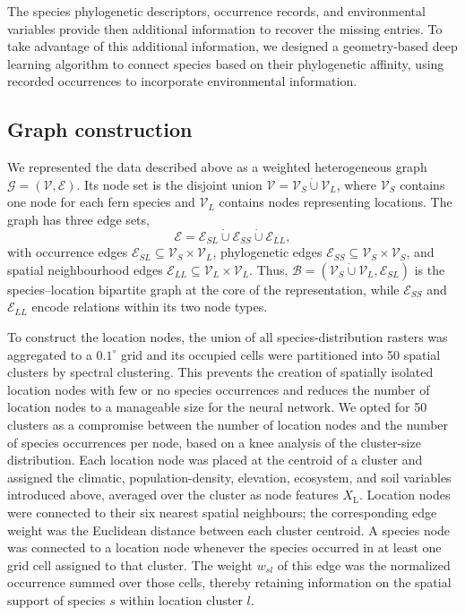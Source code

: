 \documentclass[preprint,12pt,authoryear]{elsarticle}
\begin{document}
The species phylogenetic descriptors, occurrence records, and environmental variables provide then additional information to recover the missing entries. To take advantage of this additional information, we designed a geometry-based deep learning algorithm to connect species based on their phylogenetic affinity, using recorded occurrences to incorporate environmental information.  

\subsection{Graph construction}
We represented the data described above as a weighted heterogeneous graph
$\mathcal{G}=(\mathcal{V},\mathcal{E})$. Its node set is the disjoint union
$\mathcal{V}=\mathcal{V}_{S}\mathbin{\dot\cup}\mathcal{V}_{L}$, where
$\mathcal{V}_{S}$ contains one node for each fern species and
$\mathcal{V}_{L}$ contains nodes representing locations. The graph has three
edge sets,
\begin{equation}
    \mathcal{E}=\mathcal{E}_{SL}\mathbin{\dot\cup}
    \mathcal{E}_{SS}\mathbin{\dot\cup}\mathcal{E}_{LL},
\end{equation}
with occurrence edges $\mathcal{E}_{SL}\subseteq
\mathcal{V}_{S}\times\mathcal{V}_{L}$, phylogenetic edges
$\mathcal{E}_{SS}\subseteq\mathcal{V}_{S}\times\mathcal{V}_{S}$, and spatial
neighbourhood edges $\mathcal{E}_{LL}\subseteq
\mathcal{V}_{L}\times\mathcal{V}_{L}$. Thus,
$\mathcal{B}=(\mathcal{V}_{S}\mathbin{\dot\cup}\mathcal{V}_{L},
\mathcal{E}_{SL})$ is the species--location bipartite graph at the core of the
representation, while $\mathcal{E}_{SS}$ and $\mathcal{E}_{LL}$ encode
relations within its two node types.

To construct the location nodes, the union of all species-distribution rasters
was aggregated to a $0.1^{\circ}$ grid and its occupied cells were partitioned
into 50 spatial clusters by spectral clustering. This prevents the creation of spatially isolated location nodes with few or no species occurrences and reduces the number of location nodes to a manageable size for the neural network. We opted for 50 clusters as a compromise between the number of location nodes and the number of species occurrences per node, based on a knee analysis of the cluster-size distribution.
Each location node was placed
at the centroid of a cluster and assigned the climatic, population-density,
elevation, ecosystem, and soil variables introduced above, averaged over the
cluster as node features $X_{\text{L}}$. Location nodes were connected to their six nearest spatial neighbours;
the corresponding edge weight was the Euclidean distance between each cluster
centroid. A species node was connected to a location node whenever the
species occurred in at least one grid cell assigned to that cluster. The weight
$w_{sl}$ of this edge was the normalized occurrence summed over those cells, thereby
retaining information on the spatial support of species $s$ within location
cluster $l$.
\end{document}

